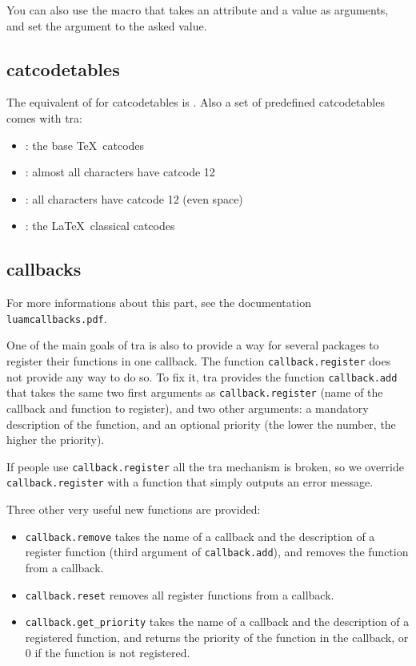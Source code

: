 \documentclass{article}
\begin{document}
You can also use the macro \texttt{\string\setluaattribute} that takes an attribute and a value as arguments, and set the argument to the asked value.

\subsection{catcodetables}

The equivalent of \texttt{\string\newcount} for catcodetables is \texttt{\string\newluacatcodetable}. Also a set of predefined catcodetables comes with \LuaTeX tra:

\begin{itemize}
\item \texttt{\string\CatcodeTableIniTeX}: the base \TeX\ catcodes
\item \texttt{\string\CatcodeTableString}: almost all characters have catcode 12
\item \texttt{\string\CatcodeTableOther}: all characters have catcode 12 (even space)
\item \texttt{\string\CatcodeTableLaTeX}: the \LaTeX\ classical catcodes
\end{itemize}

\subsection{callbacks}

For more informations about this part, see the documentation \texttt{luamcallbacks.pdf}.

One of the main goals of \LuaTeX tra is also to provide a way for several packages to register their functions in one callback. The function \texttt{callback.register} does not provide any way to do so. To fix it, \LuaTeX tra provides the function \texttt{callback.add} that takes the same two first arguments as \texttt{callback.register} (name of the callback and function to register), and two other arguments: a mandatory description of the function, and an optional priority (the lower the number, the higher the priority).

If people use \texttt{callback.register} all the \LuaTeX tra mechanism is broken, so we override \texttt{callback.register} with a function that simply outputs an error message.

Three other very useful new functions are provided:

\begin{itemize}
\item \texttt{callback.remove} takes the name of a callback and the description of a register function (third argument of \texttt{callback.add}), and removes the function from a callback.
\item \texttt{callback.reset} removes all register functions from a callback.
\item \texttt{callback.get\_priority} takes the name of a callback and the description of a registered function, and returns the priority of the function in the callback, or 0 if the function is not registered.
\end{itemize}
\end{document}
